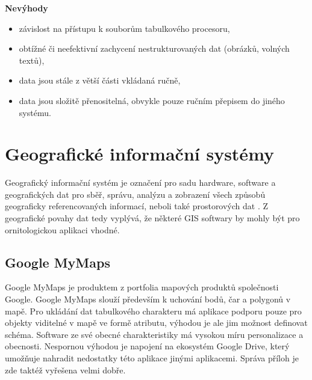\textbf{Nevýhody}
\nolisttopbreak
\begin{itemize}
	\item závislost na přístupu k souborům tabulkového procesoru,
	\item obtížné či neefektivní zachycení nestrukturovaných dat (obrázků, volných textů),
	\item data jsou stále z větší části vkládaná ručně,
	\item data jsou složitě přenositelná, obvykle pouze ručním přepisem do jiného systému.
\end{itemize}

\section{Geografické informační systémy}

Geografický informační systém je označení pro sadu hardware, software a geografických dat pro sběř, správu, analýzu a zobrazení všech způsobů geograficky referencovaných informací, neboli také prostorových dat \cite{gartnerGlossary}. Z geografické povahy dat tedy vyplývá, že některé GIS softwary by mohly být pro ornitologickou aplikaci vhodné. 

\subsection{Google MyMaps}

Google MyMaps je produktem z portfolia mapových produktů společnosti Google. Google MyMaps slouží především k uchování bodů, čar a polygonů v mapě. Pro ukládání dat tabulkového charakteru má aplikace podporu pouze pro objekty viditelné v mapě ve formě atributu, výhodou je ale jim možnost definovat schéma. Software ze své obecné charakteristiky má vysokou míru personalizace a obecnosti. Nespornou výhodou je napojení na ekosystém Google Drive, který umožňuje nahradit nedostatky této aplikace jinými aplikacemi. Správa příloh je zde taktéž vyřešena velmi dobře.


